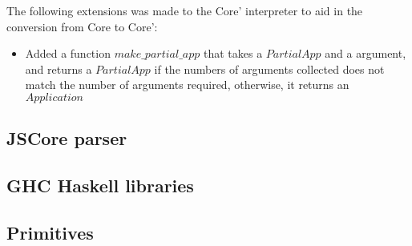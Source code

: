 The following extensions was made to the Core' interpreter to aid in the conversion from
Core to Core':

\begin{itemize}
\item Added a function $make\_partial\_app$ that takes a $PartialApp$ and a argument, and returns
a $PartialApp$ if the numbers of arguments collected does not match the number of arguments required,
otherwise, it returns an $Application$
\end{itemize}






\subsection{JSCore parser}

\subsection{GHC Haskell libraries}



\subsection{Primitives}


